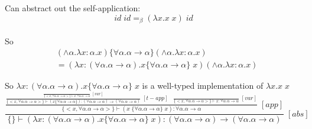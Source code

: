 \documentclass[11pt]{article}
\begin{document}
Can abstract out the self-application:
$$id\;id =_\beta (\lambda x.x\;x)\;id$$ \\

So 
\begin{align*}
&(\land \alpha.\lambda x:\alpha.x)\{\forall \alpha.\alpha \rightarrow \alpha\} (\land \alpha.\lambda x:\alpha.x) \\
&= (\lambda x:(\forall \alpha.\alpha \rightarrow \alpha).x\{\forall \alpha.\alpha \rightarrow \alpha\}\;x)(\land \alpha.\lambda x:\alpha.x) 
\end{align*}

So $\lambda x:(\forall \alpha.\alpha \rightarrow \alpha).x\{\forall \alpha.\alpha \rightarrow \alpha\}\;x$ is a well-typed implementation of $\lambda x.x\;x$ \\

$$\frac{\frac{\frac{\frac{}{\{<x,\forall \alpha.\alpha \rightarrow \alpha>\} \vdash x:\forall \alpha.\alpha \rightarrow \alpha}\;[var]}{\{<x,\forall \alpha.\alpha \rightarrow \alpha>\} \vdash (x \{\forall \alpha.\alpha \rightarrow \alpha\}): (\forall \alpha.\alpha \rightarrow \alpha) \rightarrow (\forall \alpha.\alpha \rightarrow \alpha)}\;[t-app] \;\;\; \frac{}{\{<x,\forall \alpha.\alpha \rightarrow \alpha>\} \vdash x:\forall \alpha.\alpha \rightarrow \alpha}\;[var]}{\{<x,\forall \alpha.\alpha \rightarrow \alpha>\} \vdash (x\;\{\forall \alpha.\alpha \rightarrow \alpha\}\;x):\forall \alpha.\alpha \rightarrow \alpha}\;[app]}{\{\} \vdash (\lambda x:(\forall \alpha.\alpha \rightarrow \alpha).x\{\forall \alpha.\alpha \rightarrow \alpha\}\;x): (\forall \alpha.\alpha \rightarrow \alpha) \rightarrow (\forall \alpha.\alpha \rightarrow \alpha)}\;[abs]$$
\end{document}
